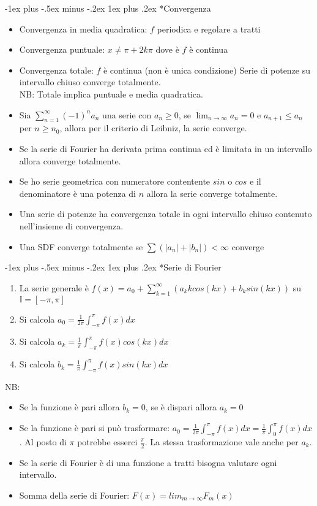 \documentclass[10pt,landscape, a4paper]{article}
\makeatletter
\renewcommand{\subsubsection}{\@startsection{subsubsection}{3}{0mm}%
                                {-1ex plus -.5ex minus -.2ex}%
                                {1ex plus .2ex}%
                                {\normalfont\small\bfseries}}
\makeatother
\begin{document}
\begin{multicols}{3}
\subsubsection*{Convergenza}
\begin{itemize}
	\item Convergenza in media quadratica: $f$ periodica e regolare a tratti
	\item Convergenza puntuale: $x \neq \pi + 2k\pi$ dove è $f$ è continua
	\item Convergenza totale: $f$ è continua (non è unica condizione)
		Serie di potenze su intervallo chiuso converge totalmente.\\
		NB: Totale implica puntuale e media quadratica.
	\item Sia $\sum_{n=1}^{\infty} (-1)^n a_n$ una serie con $a_n \geq 0$, se $\lim_{n \to \infty} a_n = 0$ e $a_{n+1} \leq a_n$ per $n \geq n_0$, allora per il criterio di Leibniz, la serie converge.
	\item Se la serie di Fourier ha derivata prima continua ed è limitata in un intervallo allora converge totalmente.
	\item Se ho serie geometrica con numeratore contentente $sin$ o $cos$ e il denominatore è una potenza di $n$ allora la serie converge totalmente.
	\item Una serie di potenze ha convergenza totale in ogni intervallo chiuso contenuto nell'insieme di convergenza.
    \item Una SDF converge totalmente se $\sum(|a_n|+|b_n|)<\infty$ converge
\end{itemize}

\subsubsection*{Serie di Fourier}
\begin{enumerate}
	\item La serie generale è $f(x) = a_0 + \sum_{k=1}^{\infty}(a_kk cos(kx) + b_ksin(kx))$ su $\mathbb{I} = [-\pi, \pi]$
	\item Si calcola $a_0 = \frac{1}{2\pi} \int_{-\pi}^{\pi} f(x)dx$
	\item Si calcola $a_k = \frac{1}{\pi} \int_{-\pi}^{\pi} f(x)cos(kx)dx$
	\item Si calcola $b_k = \frac{1}{\pi} \int_{-\pi}^{\pi} f(x)sin(kx)dx$
\end{enumerate}
NB:
\begin{itemize}
	\item Se la funzione è pari allora $b_k = 0$, se è dispari allora $a_k = 0$
	\item Se la funzione è pari si può trasformare: $a_0 = \frac{1}{2\pi} \int_{-\pi}^{\pi} f(x)dx = \frac{1}{\pi} \int_{0}^{\pi} f(x)dx$. Al posto di $\pi$ potrebbe esserci $\frac{\pi}{2}$. La stessa trasformazione vale anche per $a_k$.
	\item Se la serie di Fourier è di una funzione a tratti bisogna valutare ogni intervallo.
	\item Somma della serie di Fourier: $F(x) = lim_{m \to \infty} F_m(x)$
\end{itemize}


\end{multicols}
\end{document}
